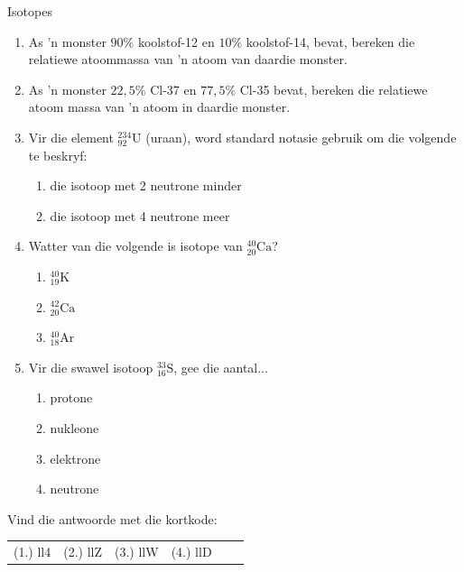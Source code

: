 \begin{exercises}  {Isotopes }
\begin{enumerate}[noitemsep, label=\textbf{\arabic*}. ]
\item As 'n monster $90\%$ koolstof-12 en $10\%$ koolstof-14, bevat, bereken die relatiewe atoommassa van 'n atoom van daardie monster.
\hspace{1ex}        
\label{m38753*uid7100}\item As 'n monster $22,5\%$ Cl-37 en $77,5\%$ Cl-35 bevat, bereken die relatiewe atoom massa van 'n atoom in daardie monster.
\item Vir die element $^{234}_{92}{\text{U}}$ (uraan), word standard notasie gebruik om die volgende te beskryf:
\begin{enumerate}[noitemsep, label=\textbf{\alph*}. ]
 \item die isotoop met 2 neutrone minder
 \item die isotoop met 4 neutrone meer
\end{enumerate}
\item Watter van die volgende is isotope van $^{40}_{20}\text{Ca}$?
\begin{enumerate}[noitemsep, label=\textbf{\alph*}. ]
 \item $^{40}_{19}\text{K}$
 \item $^{42}_{20}\text{Ca}$
 \item $^{40}_{18}\text{Ar}$
\end{enumerate}
\item Vir die swawel isotoop $^{33}_{16}\text{S}$, gee die aantal...
	\begin{enumerate}[noitemsep, label=\textbf{\alph*}. ]
	\item{protone}
	\item{nukleone}
	\item{elektrone}
	\item{neutrone}
	\end{enumerate}
\hspace{1ex}        
                \end{enumerate}
      \label{m38753*uid68}
\par {} Vind die antwoorde met die kortkode:
 \par \begin{tabular}[h]{cccccc}
 (1.) ll4  &  (2.) llZ  &  (3.) llW  &  (4.) llD  & \end{tabular}

\end{exercises}

